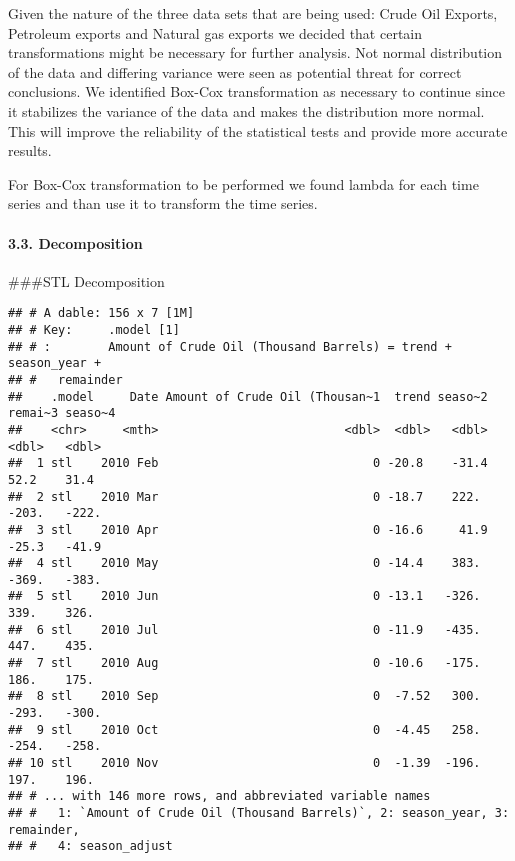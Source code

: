 \documentclass[
]{article}
\begin{document}
Given the nature of the three data sets that are being used: Crude Oil
Exports, Petroleum exports and Natural gas exports we decided that
certain transformations might be necessary for further analysis. Not
normal distribution of the data and differing variance were seen as
potential threat for correct conclusions. We identified Box-Cox
transformation as necessary to continue since it stabilizes the variance
of the data and makes the distribution more normal. This will improve
the reliability of the statistical tests and provide more accurate
results.

For Box-Cox transformation to be performed we found lambda for each time
series and than use it to transform the time series.

\hypertarget{decomposition}{%
\paragraph{3.3. Decomposition}\label{decomposition}}

\#\#\#STL Decomposition

\begin{verbatim}
## # A dable: 156 x 7 [1M]
## # Key:     .model [1]
## # :        Amount of Crude Oil (Thousand Barrels) = trend + season_year +
## #   remainder
##    .model     Date Amount of Crude Oil (Thousan~1  trend seaso~2 remai~3 seaso~4
##    <chr>     <mth>                          <dbl>  <dbl>   <dbl>   <dbl>   <dbl>
##  1 stl    2010 Feb                              0 -20.8    -31.4    52.2    31.4
##  2 stl    2010 Mar                              0 -18.7    222.   -203.   -222. 
##  3 stl    2010 Apr                              0 -16.6     41.9   -25.3   -41.9
##  4 stl    2010 May                              0 -14.4    383.   -369.   -383. 
##  5 stl    2010 Jun                              0 -13.1   -326.    339.    326. 
##  6 stl    2010 Jul                              0 -11.9   -435.    447.    435. 
##  7 stl    2010 Aug                              0 -10.6   -175.    186.    175. 
##  8 stl    2010 Sep                              0  -7.52   300.   -293.   -300. 
##  9 stl    2010 Oct                              0  -4.45   258.   -254.   -258. 
## 10 stl    2010 Nov                              0  -1.39  -196.    197.    196. 
## # ... with 146 more rows, and abbreviated variable names
## #   1: `Amount of Crude Oil (Thousand Barrels)`, 2: season_year, 3: remainder,
## #   4: season_adjust
\end{verbatim}
\end{document}
